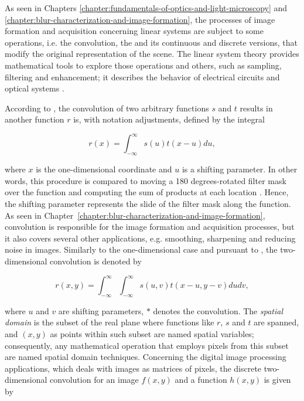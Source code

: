 As seen in Chapters \ref{chapter:fundamentals-of-optics-and-light-microscopy} and \ref{chapter:blur-characterization-and-image-formation}, the processes of image formation and acquisition concerning linear systems are subject to some operations, i.e. the convolution, the  and its continuous and discrete versions, that modify the original representation of the scene. The linear system theory provides mathematical tools to explore those operations and others, such as sampling, filtering and enhancement; it describes the behavior of electrical circuits and optical systems \cite{castleman1996digital}.

According to , the convolution of two arbitrary functions $s$ and $t$ results in another function $r$ is, with notation adjustments, defined by the integral

\begin{equation}
\label{eqn:one_dimensional_convolution}
r(x) = \int_{-\infty}^{\infty}s(u) t(x - u) du,
\end{equation}

\noindent where $x$ is the one-dimensional coordinate and $u$ is a shifting parameter. In other words, this procedure is compared to moving a 180 degrees-rotated filter mask over the function and computing the sum of products at each location \cite{gonzalez2018digital}. Hence, the shifting parameter represents the slide of the filter mask along the function. As seen in Chapter~\ref{chapter:blur-characterization-and-image-formation}, convolution is responsible for the image formation and acquisition processes, but it also covers several other applications, e.g. smoothing, sharpening and reducing noise in images. Similarly to the one-dimensional case and pursuant to , the two-dimensional convolution is denoted by

\begin{equation}
\label{eqn:two_dimensional_convolution}
r(x,y) = \int_{-\infty}^{\infty}
         \int_{-\infty}^{\infty}
         s(u,v) t(x - u, y - v) du dv,
\end{equation}

\noindent where $u$ and $v$ are shifting parameters, $\ast$ denotes the convolution. The \emph{spatial domain} is the subset of the real plane where functions like $r$, $s$ and $t$ are spanned, and $(x,y)$ as points within such subset are named spatial variables; consequently, any mathematical operation that employs pixels from this subset are named spatial domain techniques. Concerning the digital image processing applications, which deals with images as matrices of pixels, the discrete two-dimensional convolution for an image $f(x,y)$ and a function $h(x,y)$ is given by 

